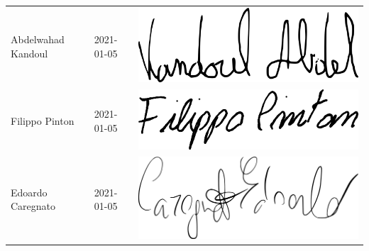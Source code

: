 {\begin{longtable}{ C{5cm} C{4cm} C{5cm} }
		{Abdelwahad Kandoul} & 2021-01-05 & \includegraphics[scale=0.20]{./src/Organigramma/immagini/firme/abdel.png}\\
		{Filippo Pinton} & 2021-01-05 & \includegraphics[scale=0.20]{./src/Organigramma/immagini/firme/filippo.png}\\
		{Edoardo Caregnato} & 2021-01-05 & \includegraphics[scale=0.20]{./src/Organigramma/immagini/firme/edoardo.png}
	\end{longtable}
}


